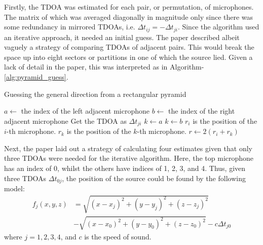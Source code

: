 \documentclass[notitlepage]{report}
\begin{document}
Firstly, the TDOA was estimated for each pair, or permutation, of microphones. The matrix of which was averaged diagonally in magnitude only since there was some redundancy in mirrored TDOAs, i.e. $\Delta t_{ij} = -\Delta t_{ji}$. Since the algorithm used an iterative approach, it needed an initial guess. The paper described albeit vaguely a strategy of comparing TDOAs of adjacent pairs. This would break the space up into eight sectors or partitions in one of which the source lied. Given a lack of detail in the paper, this was interpreted as in Algorithm-\ref{alg:pyramid_guess}.

\begin{algorithm}[H]
\caption{Guessing the general direction from a rectangular pyramid}
\label{alg:pyramid_guess}
\begin{algorithmic}
		\State $a \gets$ the index of the left adjacent microphone
		\State $b \gets$ the index of the right adjacent microphone
			\State Get the TDOA as $\Delta t_{ji}$
		\EndFor
				\State $k \gets a$
			\Else
				\State $k \gets b$
			\EndIf
			\State $r_i$ is the position of the $i$-th microphone.
			\State $r_k$ is the position of the $k$-th microphone.
			\State $r \gets 2 (r_{i} + r_{k})$ 
		\EndIf
	\EndFor
\end{algorithmic}
\end{algorithm}

Next, the paper laid out a strategy of calculating four estimates given that only three TDOAs were needed for the iterative algorithm. Here, the top microphone has an index of 0, whilst the others have indices of 1, 2, 3, and 4. Thus, given three TDOAs $\Delta t_{0j}$, the position of the source could be found by the following model:
\begin{equation}
\begin{split}
f_j(x,y,z) &= \sqrt{\left(x-x_j\right)^2 + (y - y_j)^2 + (z - z_j)^2} \\
&- \sqrt{\left(x-x_0\right)^2 + (y - y_0)^2 + (z - z_0)^2}
- c \Delta t_{j0}
\end{split}
\end{equation}
where $j = 1, 2, 3, 4$, and $c$ is the speed of sound.
\end{document}
